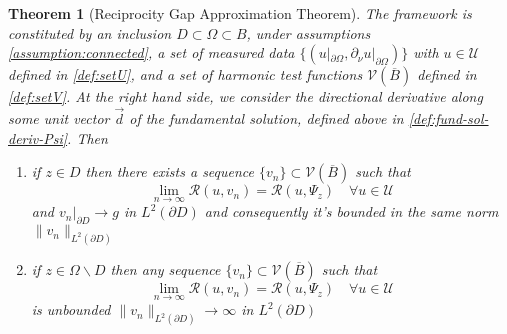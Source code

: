 \documentclass[10pt, a4paper, twoside, openright]{book}
\theoremstyle{definition}
\theoremstyle{plain}
\newtheorem{theorem}[subsection]{Theorem}
\theoremstyle{plain}
\theoremstyle{plain}
\theoremstyle{plain}
\theoremstyle{plain}
\theoremstyle{plain}
\theoremstyle{plain}
\theoremstyle{plain}
\begin{document}
\begin{theorem}[Reciprocity Gap Approximation Theorem]
 \label{theo:approximation-rg} 
 The framework is constituted by an inclusion $D\subset\Omega\subset B$, under assumptions \ref{assumption:connected}, a set of measured data $\{(u|_{\partial \Omega},\partial_\nu u|_{\partial \Omega})\}$ with $u\in\mathcal{U}$ defined in \ref{def:setU}, and a set of harmonic test functions $\mathcal{V}(\overline{B})$ defined in \ref{def:setV}. At the right hand side, we
 consider the directional derivative along some unit vector $\vec{d}$ of the fundamental solution, defined above in \ref{def:fund-sol-deriv-Psi}. Then
 \begin{enumerate}
  \item if $z \in D$ then there exists a sequence $\{v_n\} \subset \mathcal{V}(\overline{B})$ such that
   \begin{equation}
     \lim_{n\to\infty}\mathcal{R}(u,v_n) = \mathcal{R}(u,\Psi_z)\quad\forall u\in\mathcal{U}
   \end{equation}
   and $v_n|_{\partial D}\to g$ in $L^2(\partial D)$ and consequently  it's bounded in the same norm $\|v_n\|_{L^2(\partial D)}$
  \item if $z \in \Omega \backslash D$ then any sequence $\{v_n\} \subset \mathcal{V}(\overline{B})$ such that
   \begin{equation}
     \lim_{n\to\infty}\mathcal{R}(u,v_n) = \mathcal{R}(u,\Psi_z)\quad\forall u\in\mathcal{U}
   \end{equation}
   is unbounded $\|v_n\|_{L^2(\partial D)}\to\infty$ in $L^2(\partial D)$
 \end{enumerate}
\end{theorem}
\end{document}
